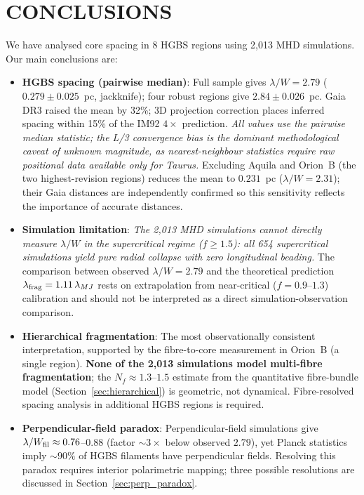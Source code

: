 \documentclass[twoside,twocolumn]{mnras}
\begin{document}
\section{CONCLUSIONS}

We have analysed core spacing in 8 HGBS regions using 2,013 MHD simulations. Our main conclusions are:

\begin{itemize}

    \item \textbf{HGBS spacing (pairwise median)}: Full sample gives $\lambda/W = 2.79$
    ($0.279 \pm 0.025$~pc, jackknife); four robust regions give $2.84 \pm 0.026$~pc.
    Gaia DR3 raised the mean by 32\%; 3D projection correction places inferred spacing within
    15\% of the IM92 $4\times$ prediction. \textit{All values use the pairwise median
    statistic; the L/3 convergence bias is the dominant methodological caveat of unknown
    magnitude, as nearest-neighbour statistics require raw positional data available only
    for Taurus.} Excluding Aquila and Orion~B (the two highest-revision regions) reduces
    the mean to $0.231$~pc ($\lambda/W = 2.31$); their Gaia distances are independently
    confirmed so this sensitivity reflects the importance of accurate distances.

    \item \textbf{Simulation limitation}: \textit{The 2,013 MHD simulations cannot directly
    measure $\lambda/W$ in the supercritical regime ($f \geq 1.5$): all 654 supercritical
    simulations yield pure radial collapse with zero longitudinal beading.} The comparison
    between observed $\lambda/W = 2.79$ and the theoretical prediction $\lambda_{\rm frag}
    = 1.11\,\lambda_{MJ}$ rests on extrapolation from near-critical ($f = 0.9$--$1.3$)
    calibration and should not be interpreted as a direct simulation-observation comparison.

    \item \textbf{Hierarchical fragmentation}: The most observationally consistent
    interpretation, supported by the \citet{Yang2024} fibre-to-core measurement in
    Orion~B (a single region). \textbf{None of the 2,013 simulations model
    multi-fibre fragmentation}; the $N_f \approx 1.3$--$1.5$ estimate from the
    quantitative fibre-bundle model (Section~\ref{sec:hierarchical}) is geometric, not
    dynamical. Fibre-resolved spacing analysis in additional HGBS regions is required.

    \item \textbf{Perpendicular-field paradox}: Perpendicular-field simulations give
    $\lambda/W_{\rm fil} \approx 0.76$--$0.88$ (factor ${\sim}3\times$ below observed
    $2.79$), yet Planck statistics imply ${\sim}90\%$ of HGBS filaments have perpendicular
    fields. Resolving this paradox requires interior polarimetric mapping; three possible
    resolutions are discussed in Section~\ref{sec:perp_paradox}.


\end{itemize}
\end{document}

